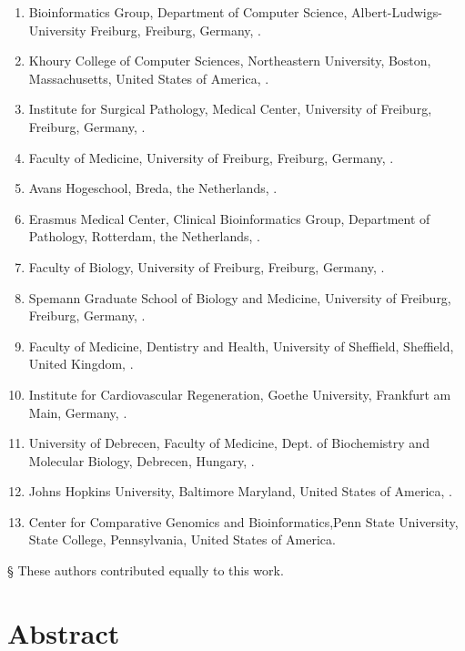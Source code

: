 \begin{enumerate}
\itemsep-0.5em
\item Bioinformatics Group, Department of Computer Science, Albert-Ludwigs-University Freiburg, Freiburg, Germany, .\label{e-learning-affil:1}
\item Khoury College of Computer Sciences, Northeastern University, Boston, Massachusetts, United States of America, .\label{e-learning-affil:2}
\item Institute for Surgical Pathology, Medical Center, University of Freiburg, Freiburg, Germany, .\label{e-learning-affil:3}
\item Faculty of Medicine, University of Freiburg, Freiburg, Germany, .\label{e-learning-affil:4}
\item Avans Hogeschool, Breda, the Netherlands, .\label{e-learning-affil:5}
\item Erasmus Medical Center, Clinical Bioinformatics Group, Department of Pathology, Rotterdam, the Netherlands, .\label{e-learning-affil:6}
\item Faculty of Biology, University of Freiburg, Freiburg, Germany, .\label{e-learning-affil:7}
\item Spemann Graduate School of Biology and Medicine, University of Freiburg, Freiburg, Germany, .\label{e-learning-affil:8}
\item Faculty of Medicine, Dentistry and Health, University of Sheffield, Sheffield, United Kingdom, .\label{e-learning-affil:9}
\item Institute for Cardiovascular Regeneration, Goethe University, Frankfurt am Main, Germany, .\label{e-learning-affil:10}
\item University of Debrecen, Faculty of Medicine, Dept. of Biochemistry and Molecular Biology, Debrecen, Hungary, .\label{e-learning-affil:11}
\item Johns Hopkins University, Baltimore Maryland, United States of America, .\label{e-learning-affil:12}
\item Center for Comparative Genomics and Bioinformatics,Penn State University, State College, Pennsylvania, United States of America.\label{e-learning-affil:13}
\end{enumerate}

§ These authors contributed equally to this work.

\section*{Abstract}

